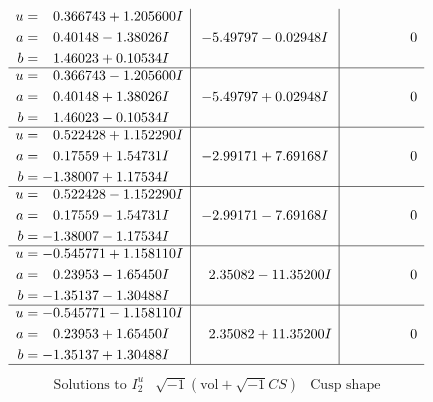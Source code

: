 \documentclass[1p]{elsarticle_modified}
\theoremstyle{definition}
\newcommand{\I}{\sqrt{-1}}
\begin{document}
$$\begin{array}{c|c|c}
\begin{aligned}
u &= \phantom{-}0.366743 + 1.205600 I \\
a &= \phantom{-}0.40148 - 1.38026 I \\
b &= \phantom{-}1.46023 + 0.10534 I\end{aligned}
 & -5.49797 - 0.02948 I & \phantom{-0.000000 } 0 \\ \hline\begin{aligned}
u &= \phantom{-}0.366743 - 1.205600 I \\
a &= \phantom{-}0.40148 + 1.38026 I \\
b &= \phantom{-}1.46023 - 0.10534 I\end{aligned}
 & -5.49797 + 0.02948 I & \phantom{-0.000000 } 0 \\ \hline\begin{aligned}
u &= \phantom{-}0.522428 + 1.152290 I \\
a &= \phantom{-}0.17559 + 1.54731 I \\
b &= -1.38007 + 1.17534 I\end{aligned}
 & -2.99171 + 7.69168 I & \phantom{-0.000000 } 0 \\ \hline\begin{aligned}
u &= \phantom{-}0.522428 - 1.152290 I \\
a &= \phantom{-}0.17559 - 1.54731 I \\
b &= -1.38007 - 1.17534 I\end{aligned}
 & -2.99171 - 7.69168 I & \phantom{-0.000000 } 0 \\ \hline\begin{aligned}
u &= -0.545771 + 1.158110 I \\
a &= \phantom{-}0.23953 - 1.65450 I \\
b &= -1.35137 - 1.30488 I\end{aligned}
 & \phantom{-}2.35082 - 11.35200 I & \phantom{-0.000000 } 0 \\ \hline\begin{aligned}
u &= -0.545771 - 1.158110 I \\
a &= \phantom{-}0.23953 + 1.65450 I \\
b &= -1.35137 + 1.30488 I\end{aligned}
 & \phantom{-}2.35082 + 11.35200 I & \phantom{-0.000000 } 0\\
 \hline 
 \end{array}$$\newpage$$\begin{array}{c|c|c}  
\text{Solutions to }I^u_{2}& \I (\text{vol} + \sqrt{-1}CS) & \text{Cusp shape}\\
 \hline 
\begin{aligned}

\end{aligned}
\end{array}$$
\end{document}
